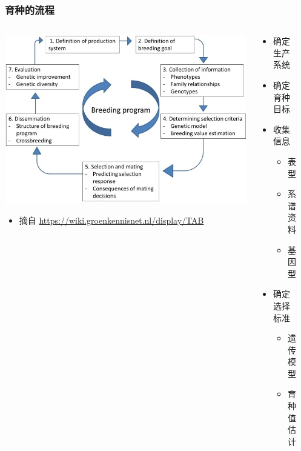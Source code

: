 \documentclass[serif,aspectratio=169]{beamer}
\begin{document}
\begin{frame}
  \frametitle{育种的流程}
  \begin{columns}
    \begin{column}{.36\textwidth}
      \includegraphics[width=\textwidth]{img/Breeding-program.jpg}
      \begin{itemize}
      \item 摘自 \tiny{\url{https://wiki.groenkennisnet.nl/display/TAB}}
      \end{itemize}
    \end{column}
    \begin{column}{.32\textwidth}
      \begin{itemize}
      \item 确定生产系统
      \item 确定育种目标
      \item 收集信息
        \begin{itemize}
        \item 表型
        \item 系谱资料
        \item {\color{cyan}基因型}
        \end{itemize}
      \item 确定选择标准
        \begin{itemize}
        \item 遗传模型
        \item 育种值估计
        \end{itemize}
      \end{itemize}
    \end{column}
    \begin{column}{.32\textwidth}

\end{column}
\end{columns}
\end{frame}
\end{document}
